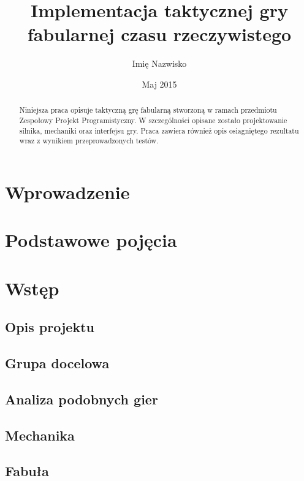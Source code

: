 \documentclass[licencjacka]{pracamgr}
\author	{Imię Nazwisko}
\title{Implementacja taktycznej gry fabularnej czasu rzeczywistego}
\date{Maj 2015}
\begin{document}
\maketitle

\begin{abstract}
  Niniejsza praca opisuje taktyczną grę fabularną stworzoną
  w ramach przedmiotu Zespołowy Projekt Programistyczny.
  W szczególności opisane zostało projektowanie silnika,
  mechaniki oraz interfejsu gry. Praca zawiera również 
  opis osiagniętego rezultatu wraz z wynikiem przeprowadzonych testów.
\end{abstract}

\tableofcontents

\chapter*{Wprowadzenie}


\chapter{Podstawowe pojęcia}

\chapter{Wstęp}

  \section{Opis projektu}

  \section{Grupa docelowa}
 
  \section{Analiza podobnych gier}
 
  \section{Mechanika}
  
  \section{Fabuła}
  
\end{document}
